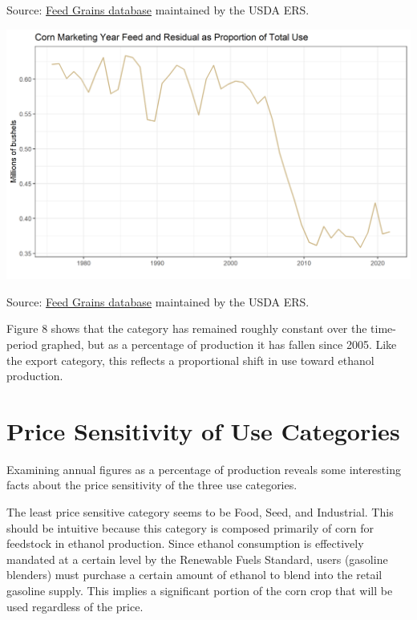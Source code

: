 \documentclass[
  letterpaper,
  DIV=11,
  numbers=noendperiod]{scrreprt}
\begin{document}
Source:
\href{http://www.ers.usda.gov/data-products/feed-grains-database/feed-grains-yearbook-tables.aspx\#26780}{Feed
Grains database} maintained by the USDA ERS.

\includegraphics{assets/ForecastingUseof-CornUseCategoriesFeedandResidPropofUse.png}

Source:
\href{http://www.ers.usda.gov/data-products/feed-grains-database/feed-grains-yearbook-tables.aspx\#26780}{Feed
Grains database} maintained by the USDA ERS.

Figure 8 shows that the category has remained roughly constant over the
time-period graphed, but as a percentage of production it has fallen
since 2005. Like the export category, this reflects a proportional shift
in use toward ethanol production.

\section{Price Sensitivity of Use
Categories}\label{price-sensitivity-of-use-categories}

Examining annual figures as a percentage of production reveals some
interesting facts about the price sensitivity of the three use
categories.

The least price sensitive category seems to be Food, Seed, and
Industrial. This should be intuitive because this category is composed
primarily of corn for feedstock in ethanol production. Since ethanol
consumption is effectively mandated at a certain level by the Renewable
Fuels Standard, users (gasoline blenders) must purchase a certain amount
of ethanol to blend into the retail gasoline supply. This implies a
significant portion of the corn crop that will be used regardless of the
price.
\end{document}
